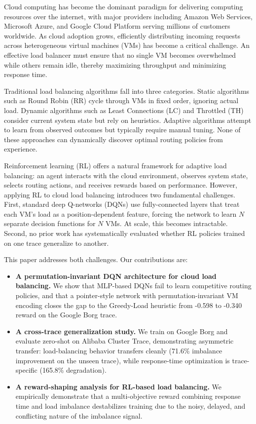 \documentclass[conference]{IEEEtran}
\begin{document}
Cloud computing has become the dominant paradigm for delivering computing resources over the internet, with major providers including Amazon Web Services, Microsoft Azure, and Google Cloud Platform serving millions of customers worldwide. As cloud adoption grows, efficiently distributing incoming requests across heterogeneous virtual machines (VMs) has become a critical challenge. An effective load balancer must ensure that no single VM becomes overwhelmed while others remain idle, thereby maximizing throughput and minimizing response time.

Traditional load balancing algorithms fall into three categories. Static algorithms such as Round Robin (RR) cycle through VMs in fixed order, ignoring actual load. Dynamic algorithms such as Least Connections (LC) and Throttled (TH) consider current system state but rely on heuristics. Adaptive algorithms attempt to learn from observed outcomes but typically require manual tuning. None of these approaches can dynamically discover optimal routing policies from experience.

Reinforcement learning (RL) offers a natural framework for adaptive load balancing: an agent interacts with the cloud environment, observes system state, selects routing actions, and receives rewards based on performance. However, applying RL to cloud load balancing introduces two fundamental challenges. First, standard deep Q-networks (DQNs) use fully-connected layers that treat each VM's load as a position-dependent feature, forcing the network to learn $N$ separate decision functions for $N$ VMs. At scale, this becomes intractable. Second, no prior work has systematically evaluated whether RL policies trained on one trace generalize to another.

This paper addresses both challenges. Our contributions are:

\begin{itemize}
    \item \textbf{A permutation-invariant DQN architecture for cloud load balancing.} We show that MLP-based DQNs fail to learn competitive routing policies, and that a pointer-style network with permutation-invariant VM encoding closes the gap to the Greedy-Load heuristic from -0.598 to -0.340 reward on the Google Borg trace.
    
    \item \textbf{A cross-trace generalization study.} We train on Google Borg and evaluate zero-shot on Alibaba Cluster Trace, demonstrating asymmetric transfer: load-balancing behavior transfers cleanly (71.6\% imbalance improvement on the unseen trace), while response-time optimization is trace-specific (165.8\% degradation).
    
    \item \textbf{A reward-shaping analysis for RL-based load balancing.} We empirically demonstrate that a multi-objective reward combining response time and load imbalance destabilizes training due to the noisy, delayed, and conflicting nature of the imbalance signal.
\end{itemize}
\end{document}
